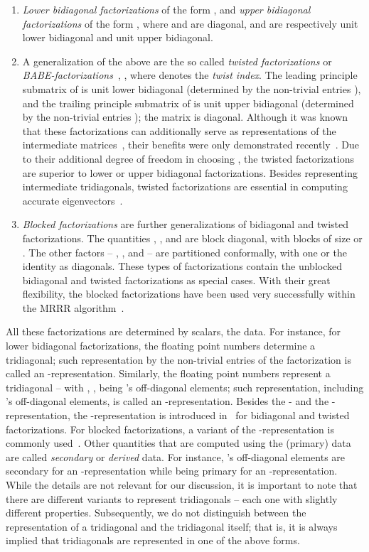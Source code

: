 \documentclass[final]{siamltex}
\begin{document}
\begin{enumerate}
\item {\it Lower bidiagonal factorizations} of the form , and {\it
    upper bidiagonal factorizations} of the form , where  and  are diagonal,  
   and  are respectively unit lower bidiagonal and
  unit upper bidiagonal. 
\item A generalization of the above are the so called {\it twisted
    factorizations} or {\it
    BABE-factorizations}~\cite{Fernando97}, , where 
   denotes the {\it twist index}. The  leading principle
  submatrix of  is unit lower bidiagonal (determined by the non-trivial
  entries ), and the 
  trailing principle submatrix of  is unit upper bidiagonal (determined by the non-trivial
  entries ); the matrix  
is diagonal. 
Although 
it was known that these factorizations can additionally serve as
representations of the intermediate
matrices~\cite{Dhillon:Diss,Dhillon:2004:Ortvecs},
their benefits were only demonstrated 
recently~\cite{Willems:Diss,Willems:twisted}. 
Due to their additional degree of freedom in choosing , the twisted
factorizations
are superior to lower or upper bidiagonal factorizations. 
Besides representing intermediate tridiagonals, twisted factorizations are
essential in computing accurate eigenvectors~\cite{Fernando97,Dhillon:2004:Ortvecs}.
\item {\it Blocked
    factorizations} are further generalizations of bidiagonal and twisted factorizations. The
  quantities , , and  
   are block diagonal, with blocks of size  or . The other factors -- , , and  -- are
  partitioned conformally, with one or the  identity as diagonals. These types of
  factorizations contain the unblocked bidiagonal and twisted factorizations
  as special cases. With their great flexibility, the blocked factorizations
  have been used very successfully within the MRRR
  algorithm~\cite{Willems:Diss,Willems:blocked}. 
\end{enumerate}
All these factorizations are determined by  scalars, the data. 
For instance, for lower bidiagonal factorizations, the  floating
point numbers  determine a
tridiagonal; such representation by the non-trivial entries of the
factorization is called an -representation. 
Similarly, the floating point numbers
 represent a tridiagonal -- with ,
,
being 's off-diagonal elements; such representation, including 's
off-diagonal elements, is called an -representation. Besides the - and
the -representation, the -representation is introduced
in~\cite{Willems:twisted} for bidiagonal and twisted factorizations. For
blocked factorizations, a variant of the -representation is commonly
used~\cite{Willems:blocked}. 
Other quantities that are computed using the
(primary) data are called {\it secondary} or {\it derived} data. For
instance, 's off-diagonal 
elements are secondary for an -representation while
being primary for an -representation. While the details are not relevant
for our discussion, it is important to note that there are different
variants to represent tridiagonals -- each one with slightly different properties.
Subsequently, we do not distinguish between the representation of a
tridiagonal and the tridiagonal itself; that is, it is always implied that
tridiagonals are represented in one of the above forms.
\end{document}
